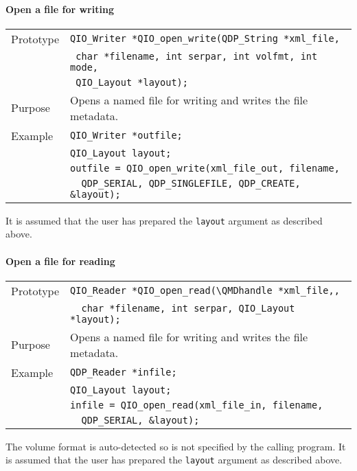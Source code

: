 \documentclass{article}
\newcommand{\QMDhandle}{{\tt QDP\_String }}
\begin{document}
\paragraph{Open a file for writing}

\begin{flushleft}
  \begin{tabular}{|l|l|}
  \hline
  Prototype      & \verb|QIO_Writer *QIO_open_write(|\QMDhandle \verb|*xml_file,|\\
		 & \verb| char *filename, int serpar, int volfmt, int mode,| \\
                 & \verb| QIO_Layout *layout);| \\
  Purpose        & Opens a named file for writing and writes the file metadata. \\
\hline
  Example  & \verb|QIO_Writer *outfile;| \\
           & \verb|QIO_Layout layout;| \\
           & \verb|outfile = QIO_open_write(xml_file_out, filename, |\\
	   & \verb|  QDP_SERIAL, QDP_SINGLEFILE, QDP_CREATE, &layout); |\\
   \hline
 \end{tabular}
\end{flushleft}
%
It is assumed that the user has prepared the \verb|layout| argument as described above.

\paragraph{Open a file for reading}

\begin{flushleft}
  \begin{tabular}{|l|l|}
  \hline
  Prototype      & \verb|QIO_Reader *QIO_open_read(\QMDhandle *xml_file,,|\\
                 & \verb|  char *filename, int serpar, QIO_Layout *layout);|\\
  Purpose        & Opens a named file for writing and writes the file metadata. \\
\hline
  Example  & \verb|QDP_Reader *infile;| \\
           & \verb|QIO_Layout layout;| \\
           & \verb|infile = QIO_open_read(xml_file_in, filename, |\\
	   & \verb|  QDP_SERIAL, &layout);| \\
   \hline
 \end{tabular}
\end{flushleft}
%
The volume format is auto-detected so is not specified by the calling
program.  It is assumed that the user has prepared the \verb|layout|
argument as described above.
\end{document}
